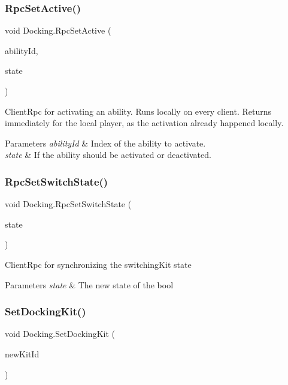 \subsubsection{\texorpdfstring{Rpc\+Set\+Active()}{RpcSetActive()}}
{\footnotesize\ttfamily void Docking.\+Rpc\+Set\+Active (\begin{DoxyParamCaption}\item[{int}]{ability\+Id,  }\item[{bool}]{state }\end{DoxyParamCaption})}



Client\+Rpc for activating an ability. Runs locally on every client. Returns immediately for the local player, as the activation already happened locally. 


\begin{DoxyParams}{Parameters}
{\em ability\+Id} & Index of the ability to activate.\\
\hline
{\em state} & If the ability should be activated or deactivated.\\
\hline
\end{DoxyParams}
\hypertarget{class_docking_a70fe421a545e05d6c696f7ea3f371156}{}\label{class_docking_a70fe421a545e05d6c696f7ea3f371156} 
\subsubsection{\texorpdfstring{Rpc\+Set\+Switch\+State()}{RpcSetSwitchState()}}
{\footnotesize\ttfamily void Docking.\+Rpc\+Set\+Switch\+State (\begin{DoxyParamCaption}\item[{bool}]{state }\end{DoxyParamCaption})}



Client\+Rpc for synchronizing the switching\+Kit state 


\begin{DoxyParams}{Parameters}
{\em state} & The new state of the bool\\
\hline
\end{DoxyParams}
\hypertarget{class_docking_ace7395b879afe6788c7095fdf6c404a1}{}\label{class_docking_ace7395b879afe6788c7095fdf6c404a1} 
\subsubsection{\texorpdfstring{Set\+Docking\+Kit()}{SetDockingKit()}}
{\footnotesize\ttfamily void Docking.\+Set\+Docking\+Kit (\begin{DoxyParamCaption}\item[{Docking\+Kit\+Id}]{new\+Kit\+Id }\end{DoxyParamCaption})}



